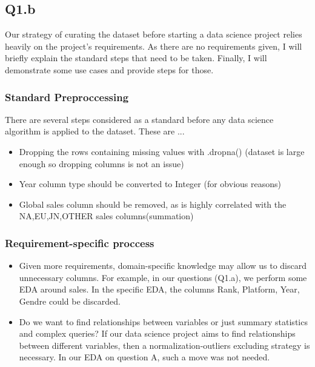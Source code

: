 \documentclass[openany]{article}
\begin{document}
		\subsection{Q1.b}
			Our strategy of curating the dataset before starting a data science project relies heavily on the project's requirements. 
			As there are no requirements given, I will briefly explain the standard steps that need to be taken. Finally, I will demonstrate 
			some use cases and provide steps for those.
			\subsubsection{Standard Preproccessing}
				There are several steps considered as a standard before any data science algorithm is applied to the dataset. These are ...
			\begin{itemize}
				\item Dropping the rows containing missing values with .dropna() (dataset is large enough so dropping columns is not an issue)
				\item Year column type should be converted to Integer (for obvious reasons)
				\item Global sales column should be removed, as is highly correlated with the NA,EU,JN,OTHER sales columns(summation)
			\end{itemize}
			\subsubsection{Requirement-specific proccess}
				\begin{itemize}
					\item Given more requirements, domain-specific knowledge may allow us to discard unnecessary columns. 
					For example, in our questions (Q1.a), we perform some EDA around sales. In the specific EDA, the columns Rank, 
					Platform, Year, Gendre could be discarded.
					\item Do we want to find relationships between variables or just summary statistics and complex queries? 
					If our data science project aims to find relationships between different variables, then a normalization-outliers 
					excluding strategy is necessary. In our EDA on question A, such a move was not needed.
				\end{itemize}
				
\end{document}
